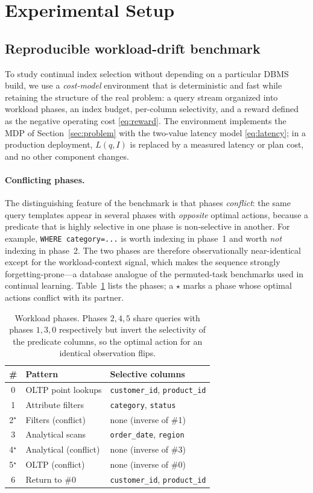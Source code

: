 \section{Experimental Setup}
\label{sec:experiments}

\subsection{Reproducible workload-drift benchmark}
To study continual index selection without depending on a particular DBMS build,
we use a \emph{cost-model} environment that is deterministic and fast while
retaining the structure of the real problem: a query stream organized into
workload phases, an index budget, per-column selectivity, and a reward defined as
the negative operating cost \eqref{eq:reward}. The environment implements the MDP
of Section~\ref{sec:problem} with the two-value latency model
\eqref{eq:latency}; in a production deployment, \(L(q,I)\) is replaced by a
measured latency or plan cost, and no other component changes.

\paragraph{Conflicting phases.}
The distinguishing feature of the benchmark is that phases \emph{conflict}: the
same query templates appear in several phases with \emph{opposite} optimal
actions, because a predicate that is highly selective in one phase is
non-selective in another. For example, \texttt{WHERE category=...} is worth
indexing in phase~1 and worth \emph{not} indexing in phase~2. The two phases are
therefore observationally near-identical except for the workload-context signal,
which makes the sequence strongly forgetting-prone---a database analogue of the
permuted-task benchmarks used in continual learning. Table~\ref{tab:phases}
lists the phases; a $\star$ marks a phase whose optimal actions conflict with its
partner.

\begin{table}[t]\centering\small
\caption{Workload phases. Phases $2,4,5$ share queries with phases $1,3,0$
respectively but invert the selectivity of the predicate columns, so the optimal
action for an identical observation flips.}
\label{tab:phases}
\begin{tabular}{cll}
\toprule
\# & Pattern & Selective columns \\
\midrule
0 & OLTP point lookups & \texttt{customer\_id}, \texttt{product\_id} \\
1 & Attribute filters & \texttt{category}, \texttt{status} \\
2$^\star$ & Filters (conflict) & none (inverse of \#1) \\
3 & Analytical scans & \texttt{order\_date}, \texttt{region} \\
4$^\star$ & Analytical (conflict) & none (inverse of \#3) \\
5$^\star$ & OLTP (conflict) & none (inverse of \#0) \\
6 & Return to \#0 & \texttt{customer\_id}, \texttt{product\_id} \\
\bottomrule
\end{tabular}
\end{table}

